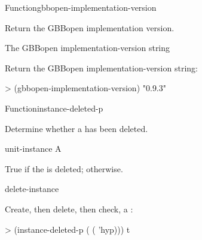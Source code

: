 \documentclass[10pt,twoside,english,pdftex]{article}
\begin{document}

\begin{functiondoc}{Function}{gbbopen-implementation-version}{\noargs{}
\returns{} }
%
%

\fnsyntax

\fnpurpose Return the GBBopen implementation version.

\fnpackage {}

\fnmodule {}

\fnreturns The GBBopen implementation-version string

\fnexample
Return the GBBopen implementation-version string:
\begin{example}
> (gbbopen-implementation-version)
"0.9.3"
\end{example}

\end{functiondoc}


\begin{functiondoc}{Function}{instance-deleted-p}{
    \returns{} }

\fnsyntax

\fnpurpose Determine whether a  has been deleted. 

\fnpackage {}

\fnmodule {}

\fnargs
\begin{args}{unit-instance}
 A 
\end{args}

\fnreturns True if the  is deleted; \nil{} otherwise.

\begin{alsos}{delete-instance}
\end{alsos}

\fnexample
{}%
%
Create, then delete, then check, a  :
\begin{example}
> (instance-deleted-p ( ( 'hyp)))
t
\end{example}

\end{functiondoc}
\end{document}
